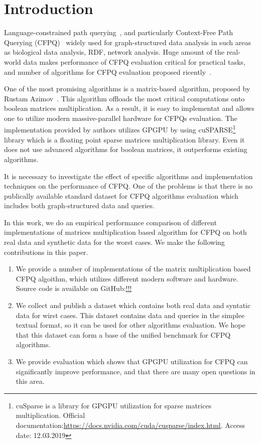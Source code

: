 \section{Introduction}

Language-constrained path querying~\cite{FLCpathProblem}, and particularly Context-Free Path Querying (CFPQ)~\cite{Yannakakis} widely used for graph-structured data analysis in such areas as biological data analysis, RDF, network analysis.
Huge amount of the real-world data makes performance of CFPQ evaluation critical for practical tasks, and number of algorithms for CFPQ evaluation proposed ricently~\cite{hellingsPathQuerying,Grigorev:2017:CPQ:3166094.3166104,Verbitskaia:2018:PCC:3241653.3241655,RDF,10.1007/978-3-319-91662-0_17,Medeiros:2018:EEC:3167132.3167265}.

One of the most promising algorithms is a matrix-based algorithm, proposed by Rustam Azimov~\cite{Azimov:2018:CPQ:3210259.3210264}.
This algorithm offloads the most critical computations onto boolean matrices multiplication.
As a result, it is easy to implementat and allows one to utilize modern massive-parallel hardware for CFPQs evaluation.
The implementation provided by authors utilizes GPGPU by using cuSPARSE\footnote{cuSparse is a library for GPGPU utilization for sparse matrices multiplication. Official documentation:\url{https://docs.nvidia.com/cuda/cusparse/index.html}. Access date: 12.03.2019} library which is a floating point sparse matrices multiplication library.
Even it does not use advanced algorithms for boolean matrices, it outperforms existing algorithms.

It is necessary to investigate the effect of specific algorithms and implementation techniques on the performance of CFPQ.
One of the problems is that there is no publically available standard dataset for CFPQ algorithms evaluation which includes both graph-structured data and queries.

In this work, we do an empirical performance comparison of different implementations of matrices multiplication based algorithm for CFPQ on both real data and synthetic data for the worst cases.
We make the following contributions in this paper.

\begin{enumerate}
\item We provide a number of implementations of the matrix multiplication based CFPQ algoithm, which utilizes different modern software and hardware.
Source code is available on GitHub:\url{!!!}
\item We collect and publish a dataset which contains both real data and syntatic data for wirst cases.
This dataset contains data and queries in the simplee textual format, so it can be used for other algorithms evaluation.
We hope that this dataset can form a base of the unified benchmark for CFPQ algorithms.
\item We provide evaluation which shows that GPGPU utilization for CFPQ can significantly improve performance, and that there are many open questions in this area.
\end{enumerate}
